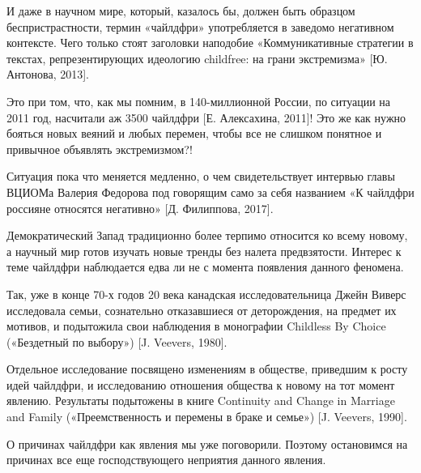 И даже в научном мире, который, казалось бы, должен быть образцом беспристрастности, термин «чайлдфри» употребляется в заведомо негативном контексте. Чего только стоят заголовки наподобие «Коммуникативные стратегии в текстах, репрезентирующих идеологию childfree: на грани экстремизма» [Ю. Антонова, 2013].

Это при том, что, как мы помним, в 140-миллионной России, по ситуации на 2011 год, насчитали аж 3500 чайлдфри [Е. Алексахина, 2011]! Это же как нужно бояться новых веяний и любых перемен, чтобы все не слишком понятное и привычное объявлять экстремизмом?!

Ситуация пока что меняется медленно, о чем свидетельствует интервью главы ВЦИОМа Валерия Федорова под говорящим само за себя названием «К чайлдфри россияне относятся негативно» [Д. Филиппова, 2017].

Демократический Запад традиционно более терпимо относится ко всему новому, а научный мир готов изучать новые тренды без налета предвзятости. Интерес к теме чайлдфри наблюдается едва ли не с момента появления данного феномена.

Так, уже в конце 70-х годов 20 века канадская исследовательница Джейн Виверс исследовала семьи, сознательно отказавшиеся от деторождения, на предмет их мотивов, и подытожила свои наблюдения в монографии Childless By Choice («Бездетный по выбору») [J. Veevers, 1980].

Отдельное исследование посвящено изменениям в обществе, приведшим к росту идей чайлдфри, и исследованию отношения общества к новому на тот момент явлению. Результаты подытожены в книге Continuity and Change in Marriage and Family («Преемственность и перемены в браке и семье») [J. Veevers, 1990].

О причинах чайлдфри как явления мы уже поговорили. Поэтому остановимся на причинах все еще господствующего неприятия данного явления.

